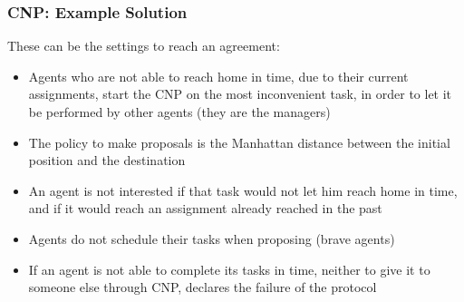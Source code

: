 \begin{frame}
	\frametitle{CNP: Example Solution}
	
	\vspace{0.3cm}
	
	These can be the settings to reach an agreement:
	
	\begin{itemize}
		\item Agents who are not able to reach home in time, due to their current
			  assignments, start the CNP on the most inconvenient task, in order to let it
			  be performed by other agents (they are the managers)
		\vspace{0.1cm}
		\item The policy to make proposals is the Manhattan distance between the initial
			  position and the destination
		\vspace{0.1cm}
		\item An agent is not interested if that task would not let him reach home in time,
			  and if it would reach an assignment already reached in the past
		\vspace{0.1cm}
		\item Agents do not schedule their tasks when proposing (brave agents)
		\vspace{0.1cm}
		\item If an agent is not able to complete its tasks in time, neither to give it to
			  someone else through CNP, declares the failure of the protocol
	\end{itemize}
\end{frame}

